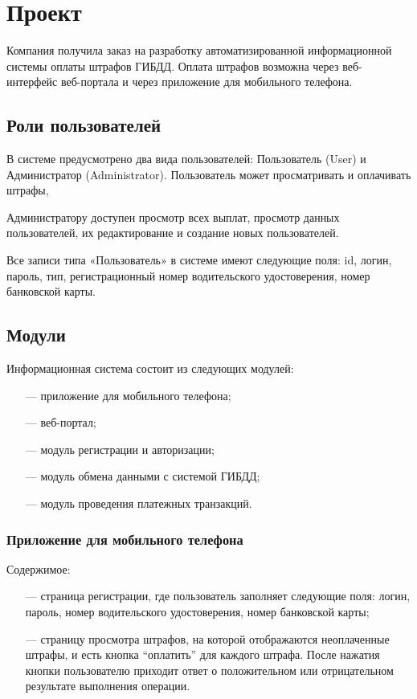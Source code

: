 \chapter{Проект}

Компания получила заказ на разработку автоматизированной информационной системы оплаты штрафов ГИБДД. Оплата штрафов возможна через веб-интерфейс веб-портала и через приложение для мобильного телефона.

\section{Роли пользователей}

В системе предусмотрено два вида пользователей: Пользователь (User) и Администратор (Administrator). Пользователь может просматривать и оплачивать штрафы, 

Администратору доступен просмотр всех выплат, просмотр данных пользователей, их редактирование и создание новых пользователей.

Все записи типа «Пользователь» в системе имеют следующие поля: id, логин, пароль, тип, регистрационный номер водительского удостоверения, номер банковской карты.

\section{Модули}
Информационная система состоит из следующих модулей:

\begin{itemize}
\item[---] приложение для мобильного телефона;
\item[---] веб-портал;
\item[---] модуль регистрации и авторизации;
\item[---] модуль обмена данными с системой ГИБДД;
\item[---] модуль проведения платежных транзакций.
\end{itemize}

\subsection{Приложение для мобильного телефона}

Содержимое:
\begin{itemize}
    \item[---] страница регистрации, где пользователь заполняет следующие поля: логин, пароль, номер водительского удостоверения, номер банковской карты;

    \item[---] страницу просмотра штрафов, на которой отображаются неоплаченные штрафы, и есть кнопка “оплатить” для каждого штрафа. После нажатия кнопки пользователю приходит ответ о положительном или отрицательном результате выполнения операции.
\end{itemize}

